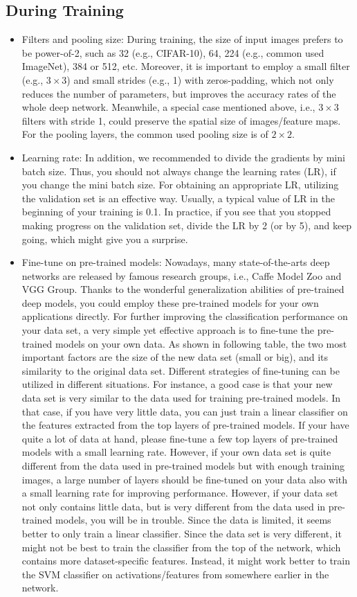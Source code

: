 \documentclass[11pt,fleqn, UTF8]{ctexbook} %
\begin{document}
\subsection{During Training}
\begin{itemize}
  \item Filters and pooling size:
   During training, the size of input images prefers to be power-of-2, such as 32 (e.g., CIFAR-10), 64, 224 (e.g., common used ImageNet), 384 or 512, etc. Moreover, it is important to employ a small filter (e.g., $3\times 3$) and small strides (e.g., 1) with zeros-padding, which not only reduces the number of parameters, but improves the accuracy rates of the whole deep network. Meanwhile, a special case mentioned above, i.e., $3\times 3$ filters with stride 1, could preserve the spatial size of images/feature maps. For the pooling layers, the common used pooling size is of $2\times 2$.
  \item Learning rate:
   In addition, we recommended to divide the gradients by mini batch size. Thus, you should not always change the learning rates (LR), if you change the mini batch size. For obtaining an appropriate LR, utilizing the validation set is an effective way. Usually, a typical value of LR in the beginning of your training is 0.1. In practice, if you see that you stopped making progress on the validation set, divide the LR by 2 (or by 5), and keep going, which might give you a surprise.
  \item Fine-tune on pre-trained models:
   Nowadays, many state-of-the-arts deep networks are released by famous research groups, i.e., Caffe Model Zoo and VGG Group. Thanks to the wonderful generalization abilities of pre-trained deep models, you could employ these pre-trained models for your own applications directly. For further improving the classification performance on your data set, a very simple yet effective approach is to fine-tune the pre-trained models on your own data. As shown in following table, the two most important factors are the size of the new data set (small or big), and its similarity to the original data set. Different strategies of fine-tuning can be utilized in different situations. For instance, a good case is that your new data set is very similar to the data used for training pre-trained models. In that case, if you have very little data, you can just train a linear classifier on the features extracted from the top layers of pre-trained models. If your have quite a lot of data at hand, please fine-tune a few top layers of pre-trained models with a small learning rate. However, if your own data set is quite different from the data used in pre-trained models but with enough training images, a large number of layers should be fine-tuned on your data also with a small learning rate for improving performance. However, if your data set not only contains little data, but is very different from the data used in pre-trained models, you will be in trouble. Since the data is limited, it seems better to only train a linear classifier. Since the data set is very different, it might not be best to train the classifier from the top of the network, which contains more dataset-specific features. Instead, it might work better to train the SVM classifier on activations/features from somewhere earlier in the network.

\end{itemize}
\end{document}
